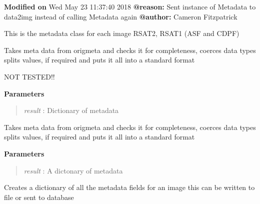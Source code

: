 \documentclass[letterpaper,10pt,openany,oneside]{sphinxmanual}
\begin{document}
\textbf{Modified on} Wed May  23 11:37:40 2018 \textbf{@reason:} Sent instance of Metadata to data2img instead of calling Metadata again \textbf{@author:} Cameron Fitzpatrick

\begin{fulllineitems}
\label{code:Metadata.Metadata}
This is the metadata class for each image RSAT2, RSAT1 (ASF and CDPF)

\begin{fulllineitems}
\label{code:Metadata.Metadata.clean_metaASF}
Takes meta data from origmeta and checks it for completeness, coerces data types
splits values, if required and puts it all into a standard format

NOT TESTED!!

\textbf{Parameters}
\begin{quote}

\emph{result} : Dictionary of metadata
\end{quote}

\end{fulllineitems}


\begin{fulllineitems}
\label{code:Metadata.Metadata.clean_metaCDPF}
Takes meta data from origmeta and checks it for completeness, coerces data types
splits values, if required and puts it all into a standard format

\textbf{Parameters}
\begin{quote}

\emph{result} : A dictonary of metadata
\end{quote}

\end{fulllineitems}


\begin{fulllineitems}
\label{code:Metadata.Metadata.createMetaDict}
Creates a dictionary of all the metadata fields for an image
this can be written to file or sent to database


\end{fulllineitems}
\end{fulllineitems}
\end{document}

